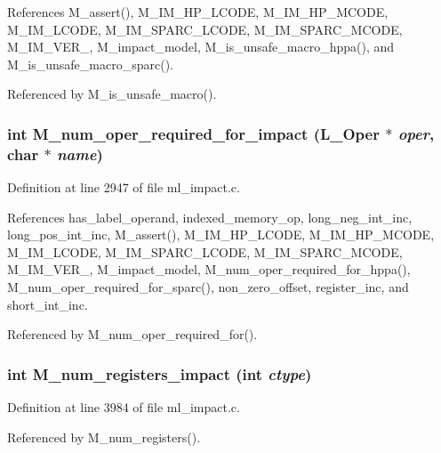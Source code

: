 References M\_\-assert(), M\_\-IM\_\-HP\_\-LCODE, M\_\-IM\_\-HP\_\-MCODE, M\_\-IM\_\-LCODE, M\_\-IM\_\-SPARC\_\-LCODE, M\_\-IM\_\-SPARC\_\-MCODE, M\_\-IM\_\-VER\_, M\_\-impact\_\-model, M\_\-is\_\-unsafe\_\-macro\_\-hppa(), and M\_\-is\_\-unsafe\_\-macro\_\-sparc().

Referenced by M\_\-is\_\-unsafe\_\-macro().
\subsubsection{\setlength{\rightskip}{0pt plus 5cm}int M\_\-num\_\-oper\_\-required\_\-for\_\-impact (L\_\-Oper $\ast$ {\em oper}, char $\ast$ {\em name})}\label{m__impact_8h_ee715afcd59360f0d1467b13415120cd}




Definition at line 2947 of file ml\_\-impact.c.

References has\_\-label\_\-operand, indexed\_\-memory\_\-op, long\_\-neg\_\-int\_\-inc, long\_\-pos\_\-int\_\-inc, M\_\-assert(), M\_\-IM\_\-HP\_\-LCODE, M\_\-IM\_\-HP\_\-MCODE, M\_\-IM\_\-LCODE, M\_\-IM\_\-SPARC\_\-LCODE, M\_\-IM\_\-SPARC\_\-MCODE, M\_\-IM\_\-VER\_, M\_\-impact\_\-model, M\_\-num\_\-oper\_\-required\_\-for\_\-hppa(), M\_\-num\_\-oper\_\-required\_\-for\_\-sparc(), non\_\-zero\_\-offset, register\_\-inc, and short\_\-int\_\-inc.

Referenced by M\_\-num\_\-oper\_\-required\_\-for().
\subsubsection{\setlength{\rightskip}{0pt plus 5cm}int M\_\-num\_\-registers\_\-impact (int {\em ctype})}\label{m__impact_8h_e7dac71a49e2df3df50be0a15d306bca}




Definition at line 3984 of file ml\_\-impact.c.

Referenced by M\_\-num\_\-registers().
